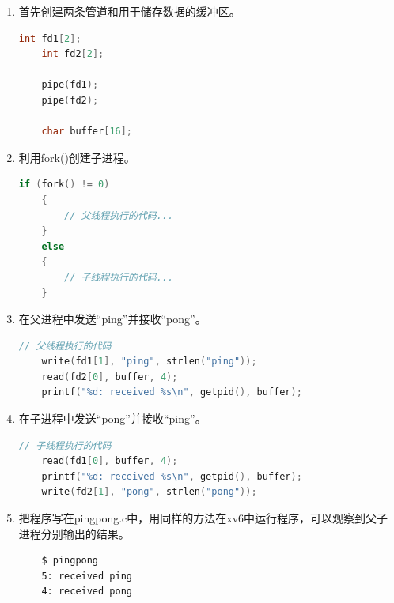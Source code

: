 \begin{enumerate}
    \item 首先创建两条管道和用于储存数据的缓冲区。
          \begin{lstlisting}[language=c,title=初始化管道和缓冲区]
    int fd1[2];
    int fd2[2];

    pipe(fd1);
    pipe(fd2);

    char buffer[16];
            \end{lstlisting}
    \item 利用fork()创建子进程。
          \begin{lstlisting}[language=c,title=fork()函数]
    if (fork() != 0)
    {
        // 父线程执行的代码...
    }
    else
    {
        // 子线程执行的代码...
    }
            \end{lstlisting}
    \item 在父进程中发送“ping”并接收“pong”。
          \begin{lstlisting}[language=c, title=父进程]
    // 父线程执行的代码
    write(fd1[1], "ping", strlen("ping"));
    read(fd2[0], buffer, 4);
    printf("%d: received %s\n", getpid(), buffer);
    \end{lstlisting}
    \item 在子进程中发送“pong”并接收“ping”。
          \begin{lstlisting}[language=c, title=子进程]
    // 子线程执行的代码
    read(fd1[0], buffer, 4);
    printf("%d: received %s\n", getpid(), buffer);
    write(fd2[1], "pong", strlen("pong"));
    \end{lstlisting}
    \item 把程序写在pingpong.c中，用同样的方法在xv6中运行程序，可以观察到父子进程分别输出的结果。
          \begin{lstlisting}
    $ pingpong
    5: received ping
    4: received pong
    \end{lstlisting}
\end{enumerate}

